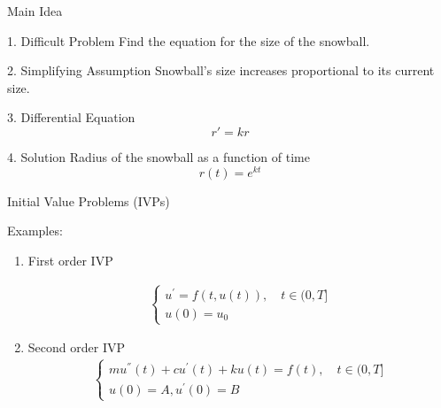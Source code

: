 \documentclass[10pt]{beamer}
\begin{document}
\begin{frame}{Main Idea}

\begin{block}{1. Difficult Problem}
    Find the equation for the size of the snowball.
\end{block}

\begin{block}{2. Simplifying Assumption}
    Snowball's size increases proportional to its current size.
\end{block}

\begin{block}{3. Differential Equation}
    $$r' = kr$$
\end{block}

\begin{block}{4. Solution}
Radius of the snowball as a function of time
    $$r(t) = e^{kt}$$
\end{block}
\end{frame}





\begin{frame}{Initial Value Problems (IVPs)}
   

Examples:
\begin{enumerate}
\item First order IVP

\begin{align*}
\begin{cases}
u^\prime = f(t,u(t)), \quad t \in (0,T]\\
u(0) = u_0
\end{cases}
\end{align*}

\item Second order IVP
\begin{align*}
\begin{cases}
m u^{''}(t) + c u^\prime (t) + k u (t) = f(t), \quad t \in (0,T]\\
u(0) = A, u^\prime(0) = B
\end{cases}
\end{align*}

\end{enumerate}

\end{frame}
\end{document}
